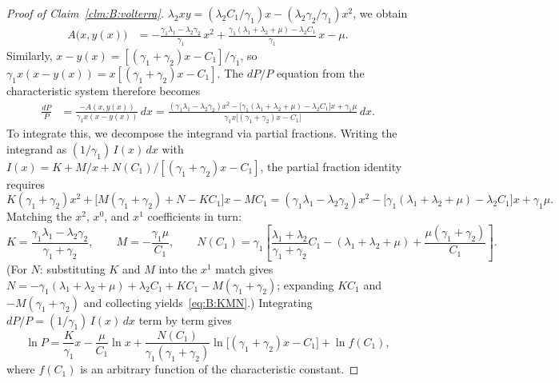 \begin{proof}[Proof of Claim~\ref{clm:B:volterra}]
$\lambda_2 xy = (\lambda_2 C_1/\gamma_1)x - (\lambda_2\gamma_2/\gamma_1)x^2$,
we obtain
\begin{align}
    A\bigl(x,y(x)\bigr)
    &= -\frac{\gamma_1\lambda_1-\lambda_2\gamma_2}{\gamma_1}\,x^2
       + \frac{\gamma_1(\lambda_1+\lambda_2+\mu)-\lambda_2 C_1}{\gamma_1}\,x
       - \mu.
    \label{eq:B:Axy}
\end{align}
Similarly, $x - y(x) = [(\gamma_1+\gamma_2)x-C_1]/\gamma_1$, so
$\gamma_1 x(x-y(x)) = x[(\gamma_1+\gamma_2)x-C_1]$.  The $dP/P$ equation from
the characteristic system therefore becomes
\begin{align}
    \frac{dP}{P}
    &= \frac{-A(x,y(x))}{\gamma_1 x(x-y(x))}\,dx
     = \frac{(\gamma_1\lambda_1 - \lambda_2\gamma_2)x^2
             - \bigl[\gamma_1(\lambda_1+\lambda_2+\mu) - \lambda_2 C_1\bigr]x
             + \gamma_1\mu}
            {\gamma_1 x\bigl[(\gamma_1+\gamma_2)x - C_1\bigr]}\,dx.
    \label{eq:B:dPP}
\end{align}
To integrate this, we decompose the integrand via partial fractions.  Writing the
integrand as $(1/\gamma_1)\,I(x)\,dx$ with
$I(x) = K + M/x + N(C_1)/[(\gamma_1+\gamma_2)x - C_1]$,
the partial fraction identity requires
\[
    K(\gamma_1+\gamma_2)x^2
    + \bigl[M(\gamma_1+\gamma_2)+N-KC_1\bigr]x
    - MC_1
    = (\gamma_1\lambda_1-\lambda_2\gamma_2)x^2
      - \bigl[\gamma_1(\lambda_1+\lambda_2+\mu)-\lambda_2 C_1\bigr]x
      + \gamma_1\mu.
\]
Matching the $x^2$, $x^0$, and $x^1$ coefficients in turn:
\begin{equation}
    K = \frac{\gamma_1\lambda_1 - \lambda_2\gamma_2}{\gamma_1+\gamma_2},
    \qquad
    M = -\frac{\gamma_1\mu}{C_1},
    \qquad
    N(C_1) = \gamma_1\!\left[
        \frac{\lambda_1+\lambda_2}{\gamma_1+\gamma_2}C_1
        - (\lambda_1+\lambda_2+\mu)
        + \frac{\mu(\gamma_1+\gamma_2)}{C_1}
    \right].
    \label{eq:B:KMN}
\end{equation}
(For $N$: substituting $K$ and $M$ into the $x^1$ match gives
$N = -\gamma_1(\lambda_1+\lambda_2+\mu)+\lambda_2 C_1+KC_1-M(\gamma_1+\gamma_2)$;
expanding $KC_1$ and $-M(\gamma_1+\gamma_2)$ and collecting yields~\eqref{eq:B:KMN}.)
Integrating $dP/P = (1/\gamma_1)\,I(x)\,dx$ term by term gives
\begin{equation}
    \ln P = \frac{K}{\gamma_1}x - \frac{\mu}{C_1}\ln x
    + \frac{N(C_1)}{\gamma_1(\gamma_1+\gamma_2)}\ln\bigl[(\gamma_1+\gamma_2)x - C_1\bigr]
    + \ln f(C_1),
    \label{eq:B:lnP}
\end{equation}
where $f(C_1)$ is an arbitrary function of the characteristic constant.

\end{proof}
